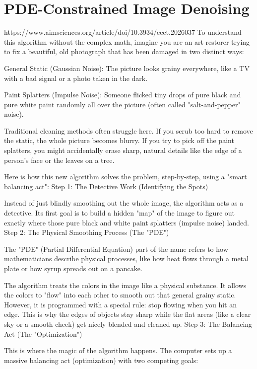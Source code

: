 \chapter{PDE-Constrained Image Denoising}

https://www.aimsciences.org/article/doi/10.3934/eect.2026037
To understand this algorithm without the complex math, imagine you are an art restorer trying to fix a beautiful, old photograph that has been damaged in two distinct ways:

    General Static (Gaussian Noise): The picture looks grainy everywhere, like a TV with a bad signal or a photo taken in the dark.

    Paint Splatters (Impulse Noise): Someone flicked tiny drops of pure black and pure white paint randomly all over the picture (often called "salt-and-pepper" noise).

Traditional cleaning methods often struggle here. If you scrub too hard to remove the static, the whole picture becomes blurry. If you try to pick off the paint splatters, you might accidentally erase sharp, natural details like the edge of a person's face or the leaves on a tree.

Here is how this new algorithm solves the problem, step-by-step, using a "smart balancing act":
Step 1: The Detective Work (Identifying the Spots)

Instead of just blindly smoothing out the whole image, the algorithm acts as a detective. Its first goal is to build a hidden "map" of the image to figure out exactly where those pure black and white paint splatters (impulse noise) landed.
Step 2: The Physical Smoothing Process (The "PDE")

The "PDE" (Partial Differential Equation) part of the name refers to how mathematicians describe physical processes, like how heat flows through a metal plate or how syrup spreads out on a pancake.

The algorithm treats the colors in the image like a physical substance. It allows the colors to "flow" into each other to smooth out that general grainy static. However, it is programmed with a special rule: stop flowing when you hit an edge. This is why the edges of objects stay sharp while the flat areas (like a clear sky or a smooth cheek) get nicely blended and cleaned up.
Step 3: The Balancing Act (The "Optimization")

This is where the magic of the algorithm happens. The computer sets up a massive balancing act (optimization) with two competing goals:

